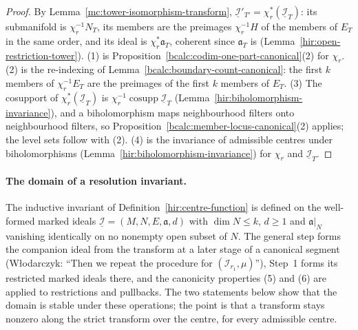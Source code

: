 \begin{proof}
\upstreamleanok
By Lemma~\ref{mc:tower-isomorphism-transform}, \(\underline{\mathcal I}'_{T'}=\chi_r^*(\underline{\mathcal I}_T)\): its submanifold is \(\chi_r^{-1}N_T\), its members are the preimages
\(\chi_r^{-1}H\) of the members of \(E_T\) in the same order, and its ideal is \(\chi_r^*\mathfrak a_T\), coherent since \(\mathfrak a_T\) is (Lemma~\ref{hir:open-restriction-tower}).
(1) is Proposition~\ref{bcalc:codim-one-part-canonical}(2) for \(\chi_r\). (2) is the re-indexing of Lemma~\ref{bcalc:boundary-count-canonical}: the first \(k\) members of
\(\chi_r^{-1}E_T\) are the preimages of the first \(k\) members of \(E_T\). (3) The cosupport of \(\chi_r^*(\underline{\mathcal I}_T)\) is \(\chi_r^{-1}\operatorname{cosupp}\underline{\mathcal I}_T\)
(Lemma~\ref{hir:biholomorphism-invariance}), and a biholomorphism maps neighbourhood filters onto neighbourhood filters, so Proposition~\ref{bcalc:member-locus-canonical}(2) applies;
the level sets follow with (2). (4) is the invariance of admissible centres under biholomorphisms (Lemma~\ref{hir:biholomorphism-invariance}) for \(\chi_r\) and
\(\underline{\mathcal I}_T\).
\end{proof}

\paragraph{The domain of a resolution invariant.} The inductive invariant of Definition~\ref{hir:centre-function} is defined on the well-formed marked
ideals \(\underline{\mathcal I}=(M,N,E,\mathfrak a,d)\) with \(\dim N\le k\), \(d\ge1\) and \(\mathfrak a|_N\) vanishing identically on no nonempty open subset of \(N\). The
general step forms the companion ideal from the transform at a later stage of a canonical segment (Włodarczyk: ``Then we repeat the procedure for
\(({\mathcal I}_{r_1},\mu)\)''), Step~1 forms its restricted marked ideals there, and the canonicity properties (5) and (6) are applied to restrictions and
pullbacks. The two statements below show that the domain is stable under these operations; the point is that a transform stays nonzero along the
strict transform over the centre, for every admissible centre.

